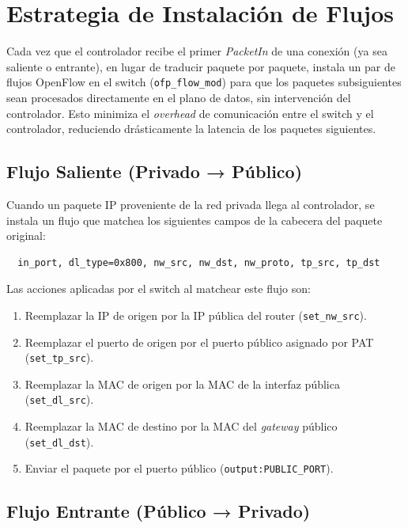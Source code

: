 \documentclass[11pt, a4paper]{article}
\begin{document}
\section{Estrategia de Instalación de Flujos}
\label{sec:estrategia_flujos}

Cada vez que el controlador recibe el primer \textit{PacketIn} de una conexión (ya sea saliente o entrante), en lugar de traducir paquete por paquete, instala un par de flujos OpenFlow en el switch (\texttt{ofp\_flow\_mod}) para que los paquetes subsiguientes sean procesados directamente en el plano de datos, sin intervención del controlador. Esto minimiza el \textit{overhead} de comunicación entre el switch y el controlador, reduciendo drásticamente la latencia de los paquetes siguientes.

\subsection{Flujo Saliente (Privado → Público)}
\label{subsec:flow_out}

Cuando un paquete IP proveniente de la red privada llega al controlador, se instala un flujo que matchea los siguientes campos de la cabecera del paquete original:

\begin{verbatim}
  in_port, dl_type=0x800, nw_src, nw_dst, nw_proto, tp_src, tp_dst
\end{verbatim}

Las acciones aplicadas por el switch al matchear este flujo son:

\begin{enumerate}
    \item Reemplazar la IP de origen por la IP pública del router (\texttt{set\_nw\_src}).
    \item Reemplazar el puerto de origen por el puerto público asignado por PAT (\texttt{set\_tp\_src}).
    \item Reemplazar la MAC de origen por la MAC de la interfaz pública (\texttt{set\_dl\_src}).
    \item Reemplazar la MAC de destino por la MAC del \textit{gateway} público (\texttt{set\_dl\_dst}).
    \item Enviar el paquete por el puerto público (\texttt{output:PUBLIC\_PORT}).
\end{enumerate}

\subsection{Flujo Entrante (Público → Privado)}
\label{subsec:flow_in}
\end{document}
